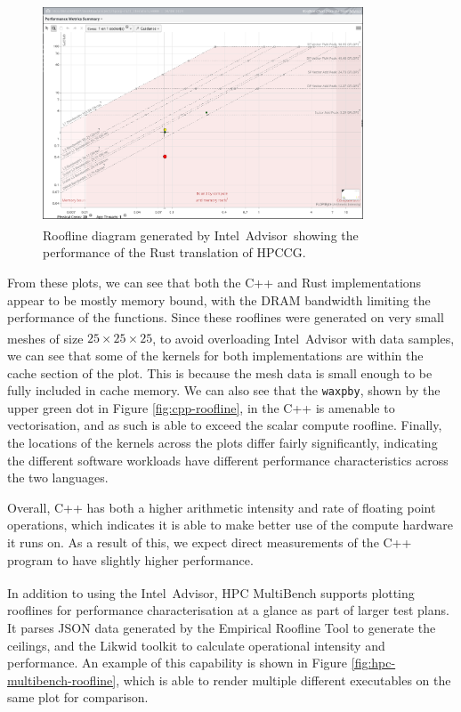 \begin{figure}[H]
    \centering
    \includegraphics[width=0.85\textwidth]{images/5_performance/rooflines/rust_roofline.png}
    \caption{Roofline diagram generated by Intel\textsuperscript{\textregistered}\ Advisor\ showing the performance of the Rust translation of \acrshort{HPCCG}.}
    \label{fig:rust-roofline}
\end{figure}

From these plots, we can see that both the C++ and Rust implementations appear to be mostly memory bound, with the DRAM bandwidth limiting the performance of the functions. Since these rooflines were generated on very small meshes of size $25 \times 25 \times 25$, to avoid overloading Intel\textsuperscript{\textregistered}\ Advisor with data samples, we can see that some of the kernels for both implementations are within the cache section of the plot. This is because the mesh data is small enough to be fully included in cache memory. We can also see that the \texttt{waxpby}, shown by the upper green dot in Figure \ref{fig:cpp-roofline}, in the C++ is amenable to vectorisation, and as such is able to exceed the scalar compute roofline. Finally, the locations of the kernels across the plots differ fairly significantly, indicating the different software workloads have different performance characteristics across the two languages.

Overall, C++ has both a higher arithmetic intensity and rate of floating point operations, which indicates it is able to make better use of the compute hardware it runs on. As a result of this, we expect direct measurements of the C++ program to have slightly higher performance.

In addition to using the Intel\textsuperscript{\textregistered}\ Advisor, HPC MultiBench supports plotting rooflines for performance characterisation at a glance as part of larger test plans. It parses JSON data generated by the Empirical Roofline Tool \cite{EmpiricalRooflineTool} to generate the ceilings, and the Likwid toolkit \cite{RRZEHPCLikwid2024} to calculate operational intensity and performance. An example of this capability is shown in Figure \ref{fig:hpc-multibench-roofline}, which is able to render multiple different executables on the same plot for comparison.

